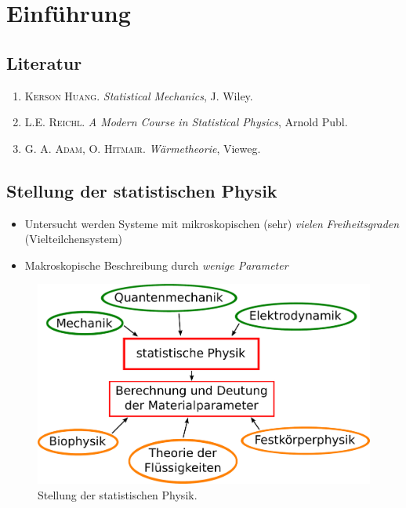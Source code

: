 \section{Einführung}
\subsection{Literatur}
\begin{enumerate}
  \item \textsc{Kerson Huang}. \emph{Statistical Mechanics}, J. Wiley.
  \item \textsc{L.E. Reichl}. \emph{A Modern Course in Statistical Physics}, Arnold Publ.
  \item \textsc{G. A. Adam, O. Hitmair}. \emph{Wärmetheorie}, Vieweg.
\end{enumerate}
\subsection{Stellung der statistischen Physik}
\begin{itemize}
  \item Untersucht werden Systeme mit mikroskopischen (sehr) \emph{vielen} \emph{Freiheitsgraden} \\ 
  		(Vielteilchensystem)
  \item Makroskopische Beschreibung durch \emph{wenige Parameter}
\end{itemize}
\begin{figure}[H]
\begin{center}
  \includegraphics[width=\textwidth]{../img/dependencies.pdf}
  \caption{Stellung der statistischen Physik.}
  \label{img:position_statphys}
\end{center}
\end{figure}